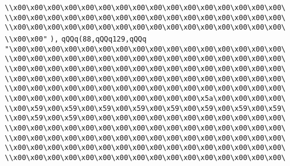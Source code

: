 \verb|\\x00\x00\x00\x00\x00\x00\x00\x00\x00\x00\x00\x00\x00\x00\x00\x00\|\newline
\verb|\\x00\x00\x00\x00\x00\x00\x00\x00\x00\x00\x00\x00\x00\x00\x00\x00\|\newline
\verb|\\x00\x00\x00\x00\x00\x00\x00\x00\x00\x00\x00\x00\x00\x00\x00\x00\|\newline
\verb|\\x00\x00"|\newline
\verb|),|\newline
\verb|qQQq(88,qQQq129,qQQq|\newline
\verb|"\x00\x00\x00\x00\x00\x00\x00\x00\x00\x00\x00\x00\x00\x00\x00\x00\|\newline
\verb|\\x00\x00\x00\x00\x00\x00\x00\x00\x00\x00\x00\x00\x00\x00\x00\x00\|\newline
\verb|\\x00\x00\x00\x00\x00\x00\x00\x00\x00\x00\x00\x00\x00\x00\x00\x00\|\newline
\verb|\\x00\x00\x00\x00\x00\x00\x00\x00\x00\x00\x00\x00\x00\x00\x00\x00\|\newline
\verb|\\x00\x00\x00\x00\x00\x00\x00\x00\x00\x00\x00\x00\x00\x00\x00\x00\|\newline
\verb|\\x00\x00\x00\x00\x00\x00\x00\x00\x00\x00\x00\x5a\x00\x00\x00\x00\|\newline
\verb|\\x00\x59\x00\x59\x00\x59\x00\x59\x00\x59\x00\x59\x00\x59\x00\x59\|\newline
\verb|\\x00\x59\x00\x59\x00\x00\x00\x00\x00\x00\x00\x00\x00\x00\x00\x00\|\newline
\verb|\\x00\x00\x00\x00\x00\x00\x00\x00\x00\x00\x00\x00\x00\x00\x00\x00\|\newline
\verb|\\x00\x00\x00\x00\x00\x00\x00\x00\x00\x00\x00\x00\x00\x00\x00\x00\|\newline
\verb|\\x00\x00\x00\x00\x00\x00\x00\x00\x00\x00\x00\x00\x00\x00\x00\x00\|\newline
\verb|\\x00\x00\x00\x00\x00\x00\x00\x00\x00\x00\x00\x00\x00\x00\x00\x00\|\newline
